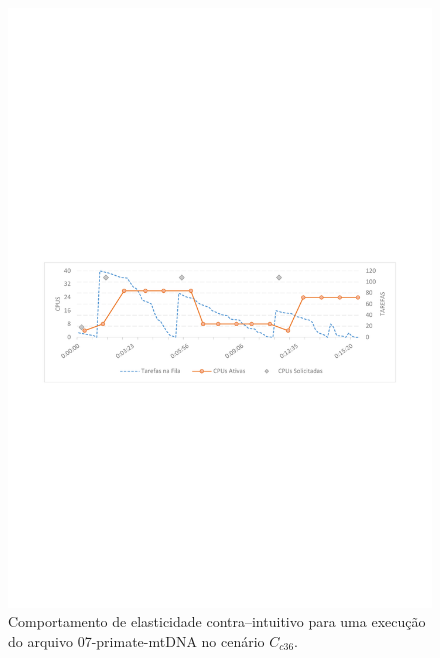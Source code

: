 \documentclass[english,brazilian]{UNISINOSmonografia} %
\begin{document}
\begin{figure}[p]
	\centering%
	\begin{minipage}{\textwidth}
		\caption{Comportamento de elasticidade contra--intuitivo para uma execução do arquivo 07-primate-mtDNA no cenário $C_{c36}$.}
		\label{fig:results-modelo-batch-primate}
		\vspace{1ex}
		\includegraphics[trim=60 325 60 360,clip,width=\textwidth]{primate-mtDNA_36cpu}
	\end{minipage}
\end{figure}
\end{document}
